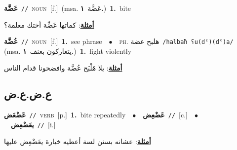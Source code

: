 \documentclass[10pt,a4paper,twoside]{article} %
\begin{document}
\begin{multicols}{2}
{\setlength\topsep{0pt}\textbf{\foreignlanguage{arabic}{عَضَّة}}\ {\color{gray}\texttt{//}\color{black}}\ \textsc{noun}\ [f.]\ \color{gray}(msa. \foreignlanguage{arabic}{عَضَّة}~\foreignlanguage{arabic}{\textbf{١.}})\color{black}\ \textbf{1.}~bite\  \begin{flushright}\color{gray}\foreignlanguage{arabic}{\textbf{\underline{\foreignlanguage{arabic}{أمثلة}}}: كماتها عَضِّة أختك معلمة؟}\end{flushright}\color{black}} \vspace{2mm}

{\setlength\topsep{0pt}\textbf{\foreignlanguage{arabic}{عُضَّة}}\ {\color{gray}\texttt{//}\color{black}}\ \textsc{noun}\ [f.]\ \textbf{1.}~see phrase\ \ $\bullet$\ \ \textsc{ph.} \color{gray} \foreignlanguage{arabic}{هلبح عضة}\color{black}\ {\color{gray}\texttt{/{\sffamily halbaħ ʕu(dˤ)(dˤ)a}/}\color{black}}\ \color{gray} (msa. \foreignlanguage{arabic}{يتعاركون بعنف}~\foreignlanguage{arabic}{\textbf{١.}})\color{black}\ \textbf{1.}~fight violently\  \begin{flushright}\color{gray}\foreignlanguage{arabic}{\textbf{\underline{\foreignlanguage{arabic}{أمثلة}}}: يلا هَلْبَح عُضَّة وافضحونا قدام الناس}\end{flushright}\color{black}} \vspace{2mm}

\vspace{-3mm}
\subsection*{\color{blue}\foreignlanguage{arabic}{ع.ض.ع.ض}\color{blue}{}} 

{\setlength\topsep{0pt}\textbf{\foreignlanguage{arabic}{عَضْعَض}}\ {\color{gray}\texttt{//}\color{black}}\ \textsc{verb}\ [p.]\ \textbf{1.}~bite repeatedly\ \ $\bullet$\ \ \setlength\topsep{0pt}\textbf{\foreignlanguage{arabic}{عَضْعِض}}\ {\color{gray}\texttt{//}\color{black}}\ [c.]\ \ $\bullet$\ \ \setlength\topsep{0pt}\textbf{\foreignlanguage{arabic}{يعَضْعِض}}\ {\color{gray}\texttt{//}\color{black}}\ [i.]\  \begin{flushright}\color{gray}\foreignlanguage{arabic}{\textbf{\underline{\foreignlanguage{arabic}{أمثلة}}}: عشانه بسنن لسة أعطيه خيارة يعَضْعِض عليها}\end{flushright}\color{black}} \vspace{2mm}


\end{multicols}
\end{document}
